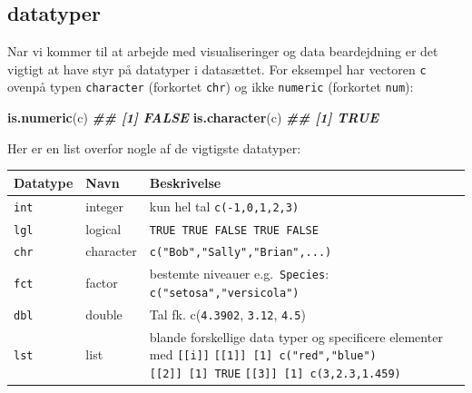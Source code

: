 \documentclass[
]{book}
\newenvironment{Shaded}{\begin{snugshade}}{\end{snugshade}}
\newcommand{\DocumentationTok}[1]{\textcolor[rgb]{0.56,0.35,0.01}{\textbf{\textit{#1}}}}
\newcommand{\FunctionTok}[1]{\textcolor[rgb]{0.13,0.29,0.53}{\textbf{#1}}}
\newcommand{\NormalTok}[1]{#1}
\theoremstyle{definition}
\theoremstyle{definition}
\theoremstyle{definition}
\theoremstyle{definition}
\theoremstyle{remark}
\begin{document}
\subsection{datatyper}\label{datatyper}

Nar vi kommer til at arbejde med visualiseringer og data beardejdning er det vigtigt at have styr på datatyper i datasættet. For eksempel har vectoren \texttt{c} ovenpå typen \texttt{character} (forkortet \texttt{chr}) og ikke \texttt{numeric} (forkortet \texttt{num}):

\begin{Shaded}
\begin{Highlighting}[]
\FunctionTok{is.numeric}\NormalTok{(c)}
\DocumentationTok{\#\# [1] FALSE}
\FunctionTok{is.character}\NormalTok{(c)}
\DocumentationTok{\#\# [1] TRUE}
\end{Highlighting}
\end{Shaded}

Her er en list overfor nogle af de vigtigste datatyper:

\begin{longtable}[]{@{}
  >{\raggedright\arraybackslash}p{}
  >{\raggedright\arraybackslash}p{}
  >{\raggedright\arraybackslash}p{}@{}}
\toprule\noalign{}
\begin{minipage}[b]{\linewidth}\raggedright
Datatype
\end{minipage} & \begin{minipage}[b]{\linewidth}\raggedright
Navn
\end{minipage} & \begin{minipage}[b]{\linewidth}\raggedright
Beskrivelse
\end{minipage} \\
\midrule\noalign{}
\endhead
\bottomrule\noalign{}
\endlastfoot
\texttt{int} & integer & kun hel tal \texttt{c(-1,0,1,2,3)} \\
\texttt{lgl} & logical & \texttt{TRUE\ TRUE\ FALSE\ TRUE\ FALSE} \\
\texttt{chr} & character & \texttt{c("Bob","Sally","Brian",...)} \\
\texttt{fct} & factor & bestemte niveauer e.g.~\texttt{Species}: \texttt{c("setosa","versicola")} \\
\texttt{dbl} & double & Tal fk. c(\texttt{4.3902}, \texttt{3.12}, \texttt{4.5}) \\
\texttt{lst} & list & blande forskellige data typer og specificere elementer med \texttt{{[}{[}i{]}{]}} \texttt{{[}{[}1{]}{]}\ {[}1{]}\ c("red","blue")} \texttt{{[}{[}2{]}{]}\ {[}1{]}\ TRUE} \texttt{{[}{[}3{]}{]}\ {[}1{]}\ c(3,2.3,1.459)} \\
\end{longtable}
\end{document}
